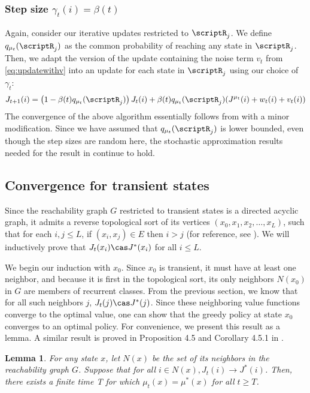 \documentclass[12pt]{article}
\newtheorem{lemma}{Lemma}
\begin{document}
\subsubsection{Step size $\gamma_t(i) = \beta(t)$}

Again, consider our iterative updates restricted to $\scriptR_j$. We define $q_{\mu_t}(\scriptR_j)$ as the common probability of reaching any state in $\scriptR_j$. Then, we adapt the version of the update containing the noise term $v_t$ from \eqref{eq:updatewithv} into an update for each state in $\scriptR_j$ using our choice of $\gamma_t$:
\begin{equation*}
J_{t+1}(i) = \left(1-\beta(t) q_{\mu_t}(\scriptR_j)\right)J_t(i) + \beta(t) q_{\mu_t}(\scriptR_j)(J^{\mu_t}(i) +  w_t(i) + v_t(i))
\end{equation*}
The convergence of the above algorithm essentially follows from \cite{tsitsiklis2002convergence} with a minor modification. Since we have assumed that $q_{\mu_t}(\scriptR_j)$ is lower bounded, even though the step sizes are random here, the stochastic approximation results needed for the result in \cite{tsitsiklis2002convergence} continue to hold.

\subsection{Convergence for transient states} \label{Convergence for transient states}

Since the reachability graph $G$ restricted to transient states is a directed acyclic graph, it admits a reverse topological sort of its vertices $(x_0, x_1, x_2, \ldots, x_L)$, such that for each $i,j \leq L$, if $(x_i, x_j) \in E$ then $i > j$ (for reference, see \cite{topological}). We will inductively prove that $J_t(x_i) \cas J^*(x_i)$ for all $i \leq L$. 

We begin our induction with $x_0$. Since $x_0$ is transient, it must have at least one neighbor, and because it is first in the topological sort, its only neighbors $N(x_0)$ in $G$ are members of recurrent classes. From the previous section, we know that for all such neighbors $j$, $J_t(j) \cas J^*(j)$. Since these neighboring value functions converge to the optimal value, one can show that the greedy policy at state $x_0$ converges to an optimal policy. For convenience, we present this result as a lemma. A similar result is proved in Proposition 4.5 and Corollary 4.5.1 in \cite{bertsekas1978stochastic}.

\begin{lemma}\label{lem_policy_conv}
	For any state $x$, let $N(x)$ be the set of its neighbors in the reachability graph $G$. Suppose that for all $i \in N(x), J_t(i) \to J^*(i)$. Then, there exists a finite time T for which $\mu_t(x) = \mu^*(x)$ for all $t \geq T$.
\end{lemma}
\end{document}
